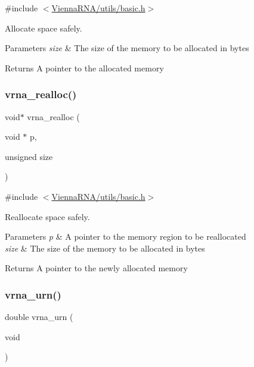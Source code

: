 {\ttfamily \#include $<$\mbox{\hyperlink{utils_2basic_8h}{Vienna\+R\+N\+A/utils/basic.\+h}}$>$}



Allocate space safely. 


\begin{DoxyParams}{Parameters}
{\em size} & The size of the memory to be allocated in bytes \\
\hline
\end{DoxyParams}
\begin{DoxyReturn}{Returns}
A pointer to the allocated memory 
\end{DoxyReturn}
\mbox{\label{group__utils_ga27f4719a66c6f90d1cca3d1e6e696c6a}} 
\subsubsection{\texorpdfstring{vrna\_realloc()}{vrna\_realloc()}}
{\footnotesize\ttfamily void$\ast$ vrna\+\_\+realloc (\begin{DoxyParamCaption}\item[{void $\ast$}]{p,  }\item[{unsigned}]{size }\end{DoxyParamCaption})}



{\ttfamily \#include $<$\mbox{\hyperlink{utils_2basic_8h}{Vienna\+R\+N\+A/utils/basic.\+h}}$>$}



Reallocate space safely. 


\begin{DoxyParams}{Parameters}
{\em p} & A pointer to the memory region to be reallocated \\
\hline
{\em size} & The size of the memory to be allocated in bytes \\
\hline
\end{DoxyParams}
\begin{DoxyReturn}{Returns}
A pointer to the newly allocated memory 
\end{DoxyReturn}
\mbox{\label{group__utils_ga384e256ebb295d04a14426179db0dd6e}} 
\subsubsection{\texorpdfstring{vrna\_urn()}{vrna\_urn()}}
{\footnotesize\ttfamily double vrna\+\_\+urn (\begin{DoxyParamCaption}\item[{void}]{ }\end{DoxyParamCaption})}




